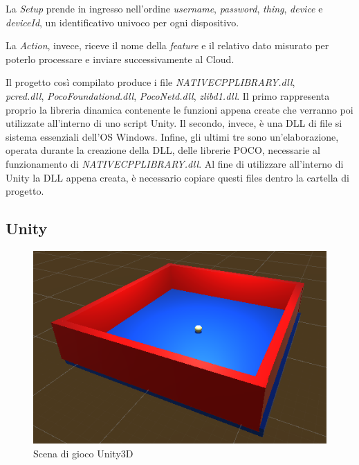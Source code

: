 La \textit{Setup} prende in ingresso nell'ordine \textit{username}, \textit{password}, \textit{thing}, \textit{device}  e \textit{deviceId}, un identificativo univoco per ogni dispositivo.

La \textit{Action}, invece, riceve il nome della \textit{feature} e il relativo dato misurato per poterlo processare e inviare successivamente al Cloud.

Il progetto così compilato produce i file \textit{NATIVECPPLIBRARY.dll}, \\\textit{pcred.dll}, \textit{PocoFoundationd.dll}, \textit{PocoNetd.dll}, \textit{zlibd1.dll}. Il primo rappresenta proprio la libreria dinamica contenente le funzioni appena create che verranno poi utilizzate all'interno di uno script Unity. Il secondo, invece, è una DLL di file si sistema essenziali dell'OS Windows. Infine, gli ultimi tre sono un’elaborazione, operata durante la creazione della DLL, delle librerie POCO, necessarie al funzionamento di  \textit{NATIVECPPLIBRARY.dll}. Al fine di utilizzare all'interno di Unity la DLL appena creata, è necessario copiare questi files dentro la cartella di progetto.
\subsection{Unity}

\begin{figure}[H]
	\centering
	\includegraphics[scale=1.1]{pics/ring}
	\caption{Scena di gioco Unity3D}
	\label{ring}
\end{figure}

